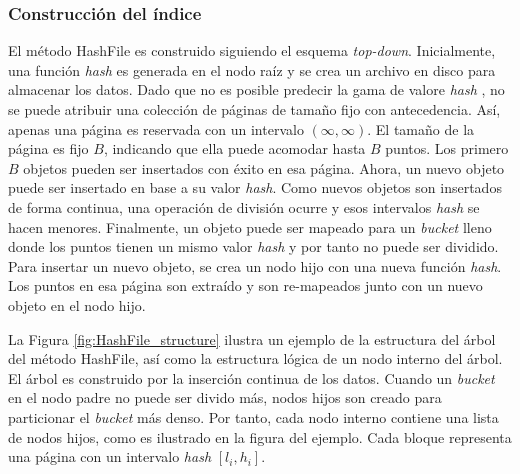  

\subsubsection{Construcción del índice}

El método HashFile es construido siguiendo el esquema \textit{top-down}. Inicialmente, una función  \textit{hash}  es generada en el nodo raíz y se crea un archivo en disco para almacenar los datos. Dado que no es posible predecir la gama de valore  \textit{hash} , no se puede atribuir una colección de páginas de tamaño fijo con antecedencia. Así, apenas una página es reservada con un intervalo $(\infty,\infty)$. El tamaño de la página es fijo $B$, indicando que ella puede acomodar hasta $B$ puntos. Los primero $B$  objetos pueden ser insertados con éxito en esa página. Ahora, un nuevo objeto puede ser insertado en base a su valor \textit{hash}. Como nuevos objetos son insertados de forma continua, una operación de división ocurre y esos intervalos \textit{hash} se hacen menores. Finalmente, un objeto puede ser mapeado para un \textit{bucket} lleno donde los puntos tienen un mismo valor \textit{hash} y por tanto no puede ser dividido. Para insertar un nuevo objeto, se crea un nodo hijo con una nueva función \textit{hash}. Los puntos en esa página son extraído y son re-mapeados junto con un nuevo objeto en el nodo hijo.

La Figura   \ref{fig:HashFile_structure} ilustra un ejemplo de la estructura del árbol del método HashFile, así como la estructura lógica de un nodo interno del árbol. El árbol es construido por la inserción continua de los datos. Cuando un \textit{bucket} en el nodo padre no puede ser divido más, nodos hijos son creado para particionar el \textit{bucket} más denso. Por tanto, cada nodo interno contiene una lista de nodos hijos, como es ilustrado en la figura del ejemplo. Cada bloque representa una página con un intervalo \textit{hash}  $[l_i, h_i]$.

